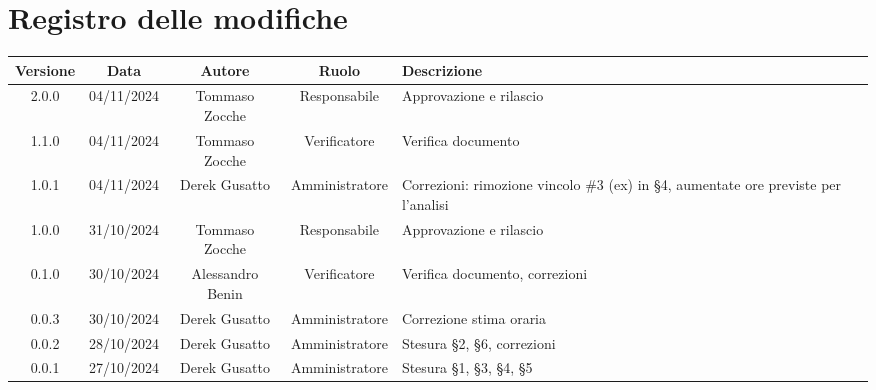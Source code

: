 
\section*{Registro delle modifiche}
\begin{table}[H]
    \begin{tabular}{|c|c|c|c|p{4cm}|}
        \hline
        \textbf{Versione} &  \textbf{Data} &  \textbf{Autore} &  \textbf{Ruolo} & \textbf{Descrizione} \\
        \hline
        2.0.0 & 04/11/2024 & Tommaso Zocche & Responsabile & Approvazione e rilascio\\
        \hline
        1.1.0 & 04/11/2024& Tommaso Zocche & Verificatore & Verifica documento \\
        \hline
        1.0.1 & 04/11/2024 & Derek Gusatto  & Amministratore &  Correzioni: rimozione vincolo   \#3 (ex) in §4, aumentate ore previste per l'analisi\\
        \hline
        1.0.0 & 31/10/2024 & Tommaso Zocche & Responsabile & Approvazione e rilascio\\
        \hline
        0.1.0 & 30/10/2024& Alessandro Benin & Verificatore & Verifica documento, correzioni \\
        \hline
        0.0.3 & 30/10/2024&Derek Gusatto  & Amministratore &  Correzione stima oraria\\
        \hline
        0.0.2 & 28/10/2024&Derek Gusatto  & Amministratore &  Stesura §2, §6, correzioni\\
        \hline
        0.0.1 & 27/10/2024&Derek Gusatto  & Amministratore &  Stesura §1, §3, §4,  §5\\
        \hline
    \end{tabular}
\end{table}